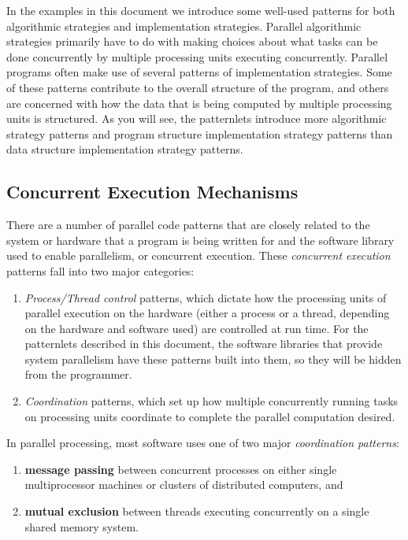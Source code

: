 \documentclass[letterpaper,10pt,openany,oneside]{sphinxmanual}
\begin{document}
In the examples in this document we introduce some well-used patterns for both algorithmic strategies and implementation strategies.  Parallel algorithmic strategies primarily have to do with making choices about what tasks can be done concurrently by multiple processing units executing concurrently.  Parallel programs often make use of several patterns of implementation strategies.  Some of these patterns contribute to the overall structure of the program, and others are concerned with how the data that is being computed by multiple processing units is structured.  As you will see, the patternlets introduce more algorithmic strategy patterns and program structure implementation strategy patterns than data structure implementation strategy patterns.


\subsection{Concurrent Execution Mechanisms}
\label{PatternsIntro:concurrent-execution-mechanisms}
There are a number of parallel code patterns that are closely related to the system or hardware that a program is being written for and the software library used to enable parallelism, or concurrent execution.  These \emph{concurrent execution} patterns fall into two major categories:
\begin{enumerate}
\item {} 
\emph{Process/Thread control} patterns, which dictate how the processing units of parallel execution on the hardware (either a process or a thread, depending on the hardware and software used) are controlled at run time.  For the patternlets described in this document, the software libraries that provide system parallelism have these patterns built into them, so they will be hidden from the programmer.

\item {} 
\emph{Coordination} patterns, which set up how multiple concurrently running tasks on processing units coordinate to complete the parallel computation desired.

\end{enumerate}

In parallel processing, most software uses one of
two major \emph{coordination patterns}:
\begin{enumerate}
\item {} 
\textbf{message passing} between concurrent processes on either single multiprocessor machines or clusters of distributed computers, and

\item {} 
\textbf{mutual exclusion} between threads executing concurrently on a single shared memory system.

\end{enumerate}
\end{document}
